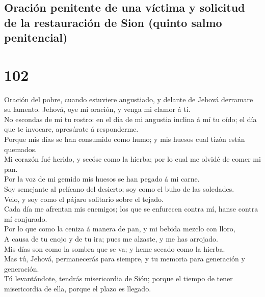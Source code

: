 \hypertarget{oraciuxf3n-penitente-de-una-vuxedctima-y-solicitud-de-la-restauraciuxf3n-de-sion-quinto-salmo-penitencial}{%
\subsection{Oración penitente de una víctima y solicitud de la
restauración de Sion (quinto salmo
penitencial)}\label{oraciuxf3n-penitente-de-una-vuxedctima-y-solicitud-de-la-restauraciuxf3n-de-sion-quinto-salmo-penitencial}}

\hypertarget{section-101}{%
\section{102}\label{section-101}}

 Oración del pobre, cuando estuviere angustiado, y delante
de Jehová derramare su lamento. Jehová, oye mi oración, y venga mi
clamor á ti.\\
 No escondas de mí tu rostro: en el día de mi angustia
inclina á mí tu oído; el día que te invocare, apresúrate á
responderme.\\
 Porque mis días se han consumido como humo; y mis huesos
cual tizón están quemados.\\
 Mi corazón fué herido, y secóse como la hierba; por lo
cual me olvidé de comer mi pan.\\
 Por la voz de mi gemido mis huesos se han pegado á mi
carne.\\
 Soy semejante al pelícano del desierto; soy como el buho
de las soledades.\\
 Velo, y soy como el pájaro solitario sobre el tejado.\\
 Cada día me afrentan mis enemigos; los que se enfurecen
contra mí, hanse contra mí conjurado.\\
 Por lo que como la ceniza á manera de pan, y mi bebida
mezclo con lloro,\\
 A causa de tu enojo y de tu ira; pues me alzaste, y me
has arrojado.\\
 Mis días son como la sombra que se va; y heme secado
como la hierba.\\
 Mas tú, Jehová, permanecerás para siempre, y tu memoria
para generación y generación.\\
 Tú levantándote, tendrás misericordia de Sión; porque el
tiempo de tener misericordia de ella, porque el plazo es llegado.\\
